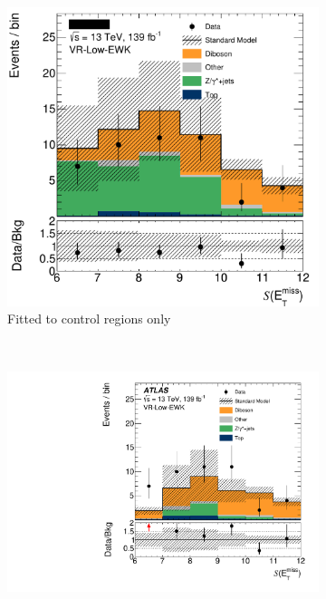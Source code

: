 \begin{figure}[tp]
\centering
\begin{subfigure}{0.62\textwidth}
\centering
\includegraphics[width=\textwidth]{figures/2ljets_prefit_VR_Low_EWK_met_Sign_no_sr.png}
\caption{Fitted to control regions only}
\end{subfigure}
\\
\begin{subfigure}{0.62\textwidth}
\centering
\includegraphics[width=\textwidth]{figures/2ljets_postfit_VR_Low_EWK_met_Sign.pdf}

\end{subfigure}
\end{figure}
